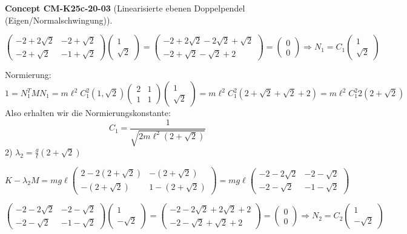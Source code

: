 \documentclass[10pt, letterpaper]{article}
\newcommand{\CustomHeading}[3]{%
  \par\medskip\noindent%
  \textbf{#1 #2} \textnormal{(#3)}.\enskip%
}
\newenvironment{CONC}[2]{\CustomHeading{Concept}{#1}{#2}}{}
\begin{document}
\begin{CONC}{CM-K25c-20-03}{Linearisierte ebenen Doppelpendel (Eigen/Normalschwingung)}
\[\begin{pmatrix}-2+2\sqrt{2} & -2+\sqrt{2} \\ -2+\sqrt{2} & -1+\sqrt{2}\end{pmatrix}\begin{pmatrix}1 \\ \sqrt{2}\end{pmatrix} = \begin{pmatrix}-2+2\sqrt{2}-2\sqrt{2}+\sqrt{2} \\ -2+\sqrt{2}-\sqrt{2}+2\end{pmatrix} = \begin{pmatrix}0 \\ 0\end{pmatrix} \Rightarrow N_1 = C_1\begin{pmatrix}1 \\ \sqrt{2}\end{pmatrix}\]

Normierung:
\[1 = N_1^T M N_1 = m\ell^2 C_1^2(1,\sqrt{2})\begin{pmatrix}2 & 1 \\ 1 & 1\end{pmatrix}\begin{pmatrix}1 \\ \sqrt{2}\end{pmatrix} = m\ell^2 C_1^2(2+\sqrt{2}+\sqrt{2}+2) = m\ell^2 C_1^2 2(2+\sqrt{2})\]
Also erhalten wir die Normierungskonstante:
\[C_1 = \frac{1}{\sqrt{2m\ell^2(2+\sqrt{2})}}\]
2) $\lambda_2 = \frac{g}{\ell}(2+\sqrt{2})$

$K-\lambda_2 M = mg\ell\begin{pmatrix}2-2(2+\sqrt{2}) & -(2+\sqrt{2}) \\ -(2+\sqrt{2}) & 1-(2+\sqrt{2})\end{pmatrix} = mg\ell\begin{pmatrix}-2-2\sqrt{2} & -2-\sqrt{2} \\ -2-\sqrt{2} & -1-\sqrt{2}\end{pmatrix}$

$\begin{pmatrix}-2-2\sqrt{2} & -2-\sqrt{2} \\ -2-\sqrt{2} & -1-\sqrt{2}\end{pmatrix}\begin{pmatrix}1 \\ -\sqrt{2}\end{pmatrix} = \begin{pmatrix}-2-2\sqrt{2}+2\sqrt{2}+2 \\ -2-\sqrt{2}+\sqrt{2}+2\end{pmatrix} = \begin{pmatrix}0 \\ 0\end{pmatrix} \Rightarrow N_2 = C_2\begin{pmatrix}1 \\ -\sqrt{2}\end{pmatrix}$


\end{CONC}
\end{document}
